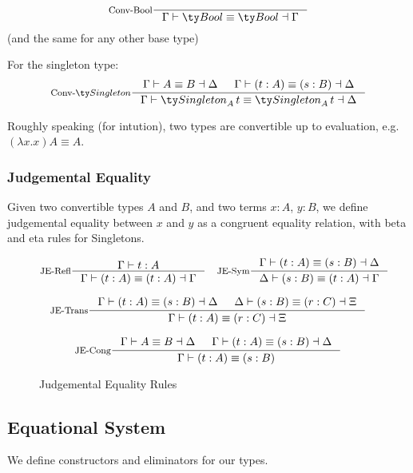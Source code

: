 \[
\inference[Conv-Bool]{}{\Gamma \vdash \Bool \equiv \Bool \dashv \Gamma}
\]
(and the same for any other base type)

For the singleton type:
\[
\inference[Conv-$\Singleton$]
    { \Gamma \vdash A \equiv B \dashv \Delta
    & \Gamma \vdash (t : A) \equiv (s : B) \dashv \Delta
    }
    { \Gamma \vdash \Singleton[A][t] \equiv \Singleton[A][t] \dashv \Delta }
\]

Roughly speaking (for intution), two types are convertible up to evaluation, e.g. $(\lambda x. x) A \equiv A$.

\subsubsection{Judgemental Equality}
Given two convertible types $A$ and $B$, and two terms $x : A$, $y : B$, we define judgemental equality between $x$ and $y$ as a congruent equality relation, with beta and eta rules for Singletons.

\begin{figure*}[h]
  \[
    \inference[JE-Refl]{\Gamma \vdash t : A}
                    {\Gamma \vdash (t : A) \equiv (t : A) \dashv \Gamma}
    \quad
    \inference[JE-Sym]{\Gamma \vdash (t : A) \equiv (s : B) \dashv \Delta}
                     {\Delta \vdash (s : B) \equiv (t : A) \dashv \Gamma}
  \]

  \[
    \inference[JE-Trans]{\Gamma \vdash (t : A) \equiv (s : B) \dashv \Delta & \Delta \vdash (s : B) \equiv (r : C) \dashv \Xi}
                     {\Gamma \vdash (t : A) \equiv (r : C) \dashv \Xi}
  \]

  \[
    \inference[JE-Cong]{\Gamma \vdash A \equiv B \dashv \Delta & \Gamma \vdash (t : A) \equiv (s : B) \dashv \Delta}
                     {\Gamma \vdash (t : A) \equiv (s : B)}
  \]

  \caption*{Judgemental Equality Rules}
  \label{fig:dt-singletons-je-rules}
\end{figure*}


\subsection{Equational System}
We define constructors and eliminators for our types.

